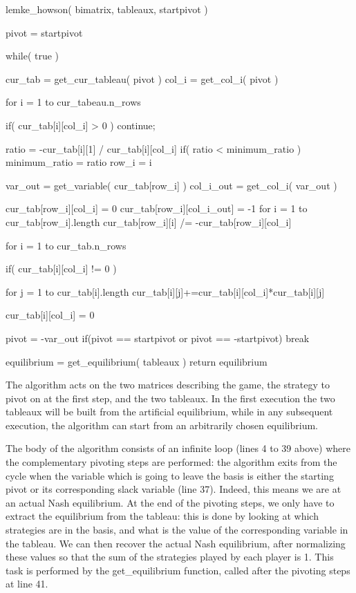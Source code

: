 \documentclass[11pt]{article}
\begin{document}
\begin{listing}[1]{1}
lemke_howson( bimatrix, tableaux, startpivot ) {
  pivot = startpivot

  while( true ) {
    cur_tab = get_cur_tableau( pivot )
    col_i = get_col_i( pivot )

    for i = 1 to cur_tabeau.n_rows {
      if( cur_tab[i][col_i] > 0 )
          continue;

      ratio = -cur_tab[i][1] / cur_tab[i][col_i]
      if( ratio < minimum_ratio ) {
        minimum_ratio = ratio
        row_i = i
      }
    }

    var_out = get_variable( cur_tab[row_i] )
    col_i_out = get_col_i( var_out )

    cur_tab[row_i][col_i] = 0
    cur_tab[row_i][col_i_out] = -1
    for i = 1 to cur_tab[row_i].length
      cur_tab[row_i][i] /= -cur_tab[row_i][col_i]

    for i = 1 to cur_tab.n_rows {
      if( cur_tab[i][col_i] != 0 ) {
         for j = 1 to cur_tab[i].length
      cur_tab[i][j]+=cur_tab[i][col_i]*cur_tab[i][j]

         cur_tab[i][col_i] = 0
      }
    }

    pivot = -var_out
    if(pivot == startpivot or pivot == -startpivot)
       break
  }

  equilibrium = get_equilibrium( tableaux )
  return equilibrium
}
\end{listing}


The algorithm acts on the two matrices describing the game, the
strategy to pivot on at the first step, and the two tableaux. In the
first execution the two tableaux will be built from the artificial
equilibrium, while in any subsequent execution, the algorithm can
start from an arbitrarily chosen equilibrium.

The body of the algorithm consists of an infinite loop (lines 4 to
39 above) where the complementary pivoting steps are performed: the
algorithm exits from the cycle when the variable which is going to
leave the basis is either the starting pivot or its corresponding
slack variable (line 37). Indeed, this means we are at an actual
Nash equilibrium. At the end of the pivoting steps, we only have to
extract the equilibrium from the tableau: this is done by looking at
which strategies are in the basis, and what is the value of the
corresponding variable in the tableau. We can then recover the
actual Nash equilibrium, after normalizing these values so that the
sum of the strategies played by each player is 1. This task is
performed by the get\_equilibrium function, called after the
pivoting steps at line 41.
\end{document}
